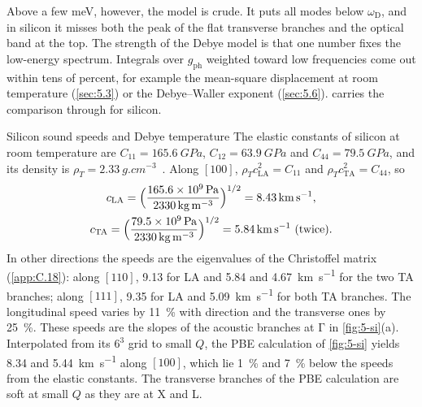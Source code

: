 Above a few meV, however, the model is crude. It puts all modes below $\omega_{\mathrm{D}}$, and in silicon it misses both the peak of the flat transverse branches and the optical band at the top. The strength of the Debye model is that one number fixes the low-energy spectrum. Integrals over $g_{\mathrm{ph}}$ weighted toward low frequencies come out within tens of percent, for example the mean-square displacement at room temperature (\cref{sec:5.3}) or the Debye--Waller exponent (\cref{sec:5.6}).  carries the comparison through for silicon.

\begin{workedexample}{Silicon sound speeds and Debye temperature}\label{we:5-debye}
The elastic constants of silicon at room temperature are $C_{11} = \SI{165.6}{GPa}$, $C_{12} = \SI{63.9}{GPa}$ and $C_{44} = \SI{79.5}{GPa}$, and its density is $\rho_T = \SI{2.33}{g.cm^{-3}}$~\cite[Table~I]{martinez2019measurements}. Along $[100]$, $\rho_Tc_{\mathrm{LA}}^2 = C_{11}$ and $\rho_Tc_{\mathrm{TA}}^2 = C_{44}$, so
\begin{gather*}
  c_{\mathrm{LA}} = \Bigl(\frac{\SI{165.6e9}{Pa}}{\SI{2330}{kg.m^{-3}}}\Bigr)^{1/2} = \SI{8.43}{km.s^{-1}} , \\
  c_{\mathrm{TA}} = \Bigl(\frac{\SI{79.5e9}{Pa}}{\SI{2330}{kg.m^{-3}}}\Bigr)^{1/2} = \SI{5.84}{km.s^{-1}}\ (\text{twice}) .
\end{gather*}
In other directions the speeds are the eigenvalues of the Christoffel matrix (\cref{app:C.18}): along $[110]$, 9.13 for LA and 5.84 and \SI{4.67}{km.s^{-1}} for the two TA branches; along $[111]$, 9.35 for LA and \SI{5.09}{km.s^{-1}} for both TA branches. The longitudinal speed varies by \SI{11}{\percent} with direction and the transverse ones by \SI{25}{\percent}. These speeds are the slopes of the acoustic branches at $\mathrm{\Gamma}$ in \cref{fig:5-si}(a). Interpolated from its $6^3$ grid to small $Q$, the PBE calculation of \cref{fig:5-si} yields 8.34 and \SI{5.44}{km.s^{-1}} along $[100]$, which lie \SI{1}{\percent} and \SI{7}{\percent} below the speeds from the elastic constants. The transverse branches of the PBE calculation are soft at small $Q$ as they are at X and L.


\end{workedexample}
